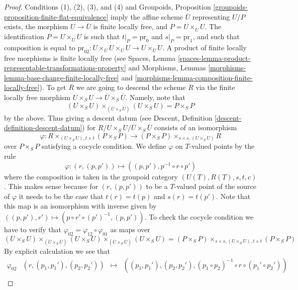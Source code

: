 \begin{proof}
Conditions (1), (2), (3), and (4) and
Groupoids, Proposition \ref{groupoids-proposition-finite-flat-equivalence}
imply the affine scheme $\overline{U}$ representing $U/P$ exists,
the morphism $U \to \overline{U}$ is finite locally free, and
$P = U \times_{\overline{U}} U$. The identification
$P = U \times_{\overline{U}} U$ is such that $t|_P = \text{pr}_0$ and
$s|_P = \text{pr}_1$, and such that composition is equal to
$\text{pr}_{02} : U \times_{\overline{U}} U \times_{\overline{U}} U
\to U \times_{\overline{U}} U$.
A product of finite locally free morphisms is finite locally free (see
Spaces, Lemma \ref{spaces-lemma-product-representable-transformations-property}
and
Morphisms, Lemmas \ref{morphisms-lemma-base-change-finite-locally-free} and
\ref{morphisms-lemma-composition-finite-locally-free}).
To get $\overline{R}$ we are going to descend
the scheme $R$ via the finite locally free morphism
$U \times_S U \to \overline{U} \times_S \overline{U}$.
Namely, note that
$$
(U \times_S U)
\times_{(\overline{U} \times_S \overline{U})}
(U \times_S U)
=
P \times_S P
$$
by the above. Thus giving a descent datum (see
Descent, Definition \ref{descent-definition-descent-datum})
for $R / U \times_S U / \overline{U} \times_S \overline{U}$
consists of an isomorphism
$$
\varphi :
R \times_{(U \times_S U), t \times t} (P \times_S P)
\longrightarrow
(P \times_S P) \times_{s \times s, (U \times_S U)} R
$$
over $P \times_S P$ satisfying a cocycle condition. We define $\varphi$
on $T$-valued points by the rule
$$
\varphi : (r, (p, p')) \longmapsto ((p, p'), p^{-1} \circ r \circ p')
$$
where the composition is taken in the groupoid category
$(U(T), R(T), s, t, c)$.
This makes sense because for $(r, (p, p'))$ to be a $T$-valued point
of the source of $\varphi$ it needs to be the case that $t(r) = t(p)$
and $s(r) = t(p')$. Note that this map is an isomorphism
with inverse given by
$((p, p'), r') \mapsto (p \circ r' \circ (p')^{-1}, (p, p'))$.
To check the cocycle condition we have to verify that
$\varphi_{02} = \varphi_{12} \circ \varphi_{01}$
as maps over
$$
(U \times_S U)
\times_{(\overline{U} \times_S \overline{U})} (U \times_S U)
\times_{(\overline{U} \times_S \overline{U})} (U \times_S U) =
(P \times_S P) \times_{s \times s, (U \times_S U), t \times t} (P \times_S P)
$$
By explicit calculation we see that
$$
\begin{matrix}
\varphi_{02} & (r, (p_1, p_1'), (p_2, p_2')) & \mapsto &
((p_1, p_1'), (p_2, p_2'),
(p_1 \circ p_2)^{-1} \circ r \circ (p_1' \circ p_2')) \\

\end{matrix}$$
\end{proof}
